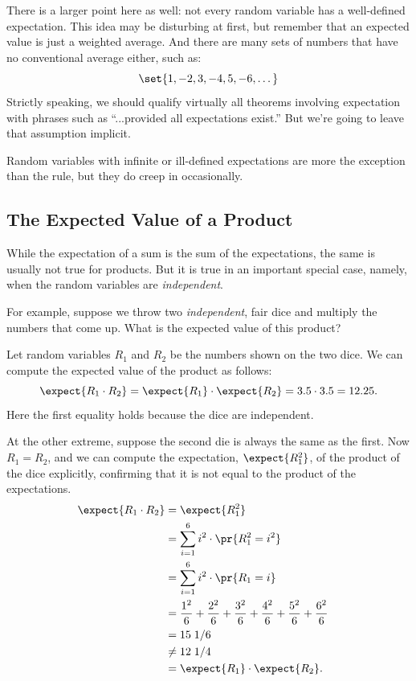 There is a larger point here as well: not every random variable has a
well-defined expectation.  This idea may be disturbing at first, but
remember that an expected value is just a weighted average.  And there
are many sets of numbers that have no conventional average either, such as:
%
\[
\set{1, -2, 3, -4, 5, -6, \dots}
\]
%
Strictly speaking, we should qualify virtually all theorems involving
expectation with phrases such as ``...provided all expectations exist.''
But we're going to leave that assumption implicit.

Random variables with infinite or ill-defined expectations are more the
exception than the rule, but they do creep in occasionally.

\fi

\subsection{The Expected Value of a Product}

While the expectation of a sum is the sum of the expectations, the same is
usually not true for products.  But it is true in an important special
case, namely, when the random variables are \emph{independent}.

For example, suppose we throw two \emph{independent}, fair dice and
multiply the numbers that come up.  What is the expected value of this
product?

Let random variables $R_1$ and $R_2$ be the numbers shown on the two
dice.  We can compute the expected value of the product as follows:
\begin{equation}\label{R1R2}
  \expect{R_1 \cdot R_2}
  = \expect{R_1} \cdot \expect{R_2}
  = 3.5 \cdot 3.5
  = 12.25.
\end{equation}
Here the first equality holds because the dice are independent.

At the other extreme, suppose the second die is always the same as the
first.  Now $R_1 = R_2$, and we can compute the expectation,
$\expect{R_1^2}$, of the product of the dice explicitly, confirming that
it is not equal to the product of the expectations.
\begin{align*}
\expect{R_1 \cdot R_2} & = \expect{R_1^2}\\
        & =    \sum_{i=1}^6 i^2 \cdot \pr{R_{1}^2 = i^2}
                    &  \\
        & =    \sum_{i=1}^6 i^2 \cdot \pr{R_{1} = i}\\
        & =    \frac{1^2}{6} + \frac{2^2}{6} + \frac{3^2}{6} + 
                \frac{4^2}{6} + \frac{5^2}{6} + \frac{6^2}{6} \\
        & =   15\; 1/6\\
        & \neq  12 \; 1/4\\
        & = \expect{R_1} \cdot \expect{R_2}.
\end{align*}


